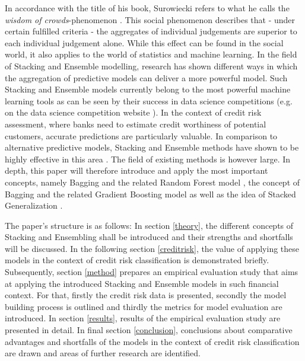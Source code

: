 \documentclass[12pt]{article}
\begin{document}
\noindent In accordance with the title of his book, Surowiecki refers to what he calls the \textit{wisdom of crowds}-phenomenon \citep{surowiecki2005wisdom}. This social phenomenon describes that - under certain fulfilled criteria - the aggregates of individual judgements are superior to each individual judgement alone. While this effect can be found in the social world, it also applies to the world of statistics and machine learning. In the field of Stacking and Ensemble modelling, research has shown different ways in which the aggregation of predictive models can deliver a more powerful model. Such Stacking and Ensemble models currently belong to the most powerful machine learning tools as can be seen by their success in data science competitions (e.g. on the data science competition website \citeauthor{kaggle}). In the context of credit risk assessment, where banks need to estimate credit worthiness of potential customers, accurate predictions are particularly valuable. In comparison to alternative predictive models, Stacking and Ensemble methods have shown to be highly effective in this area \citep{yu2008credit, zhu2017comparison}. The field of existing methods is however large. In depth, this paper will therefore introduce and apply the most important concepts, namely Bagging and the related Random Forest model \citep{breiman1996bagging, breiman2001random}, the concept of Bagging and the related Gradient Boosting model \cite{freund1996experiments, friedman2002stochastic} as well as the idea of Stacked Generalization \citep{wolpert1992stacked}. 

The paper's structure is as follows: In section \ref{theory}, the different concepts of Stacking and Ensembling shall be introduced and their strengths and shortfalls will be discussed. In the following section \ref{creditrisk}, the value of applying these models in the context of credit risk classification is demonstrated briefly. Subsequently, section \ref{method} prepares an empirical evaluation study that aims at applying the introduced Stacking and Ensemble models in such financial context. For that, firstly the credit risk data is presented, secondly the model building process is outlined and thirdly the metrics for model evaluation are introduced. In section \ref{results}, results of the empirical evaluation study are presented in detail. In final section \ref{conclusion}, conclusions about comparative advantages and shortfalls of the models in the context of credit risk classification are drawn and areas of further research are identified.
\end{document}
